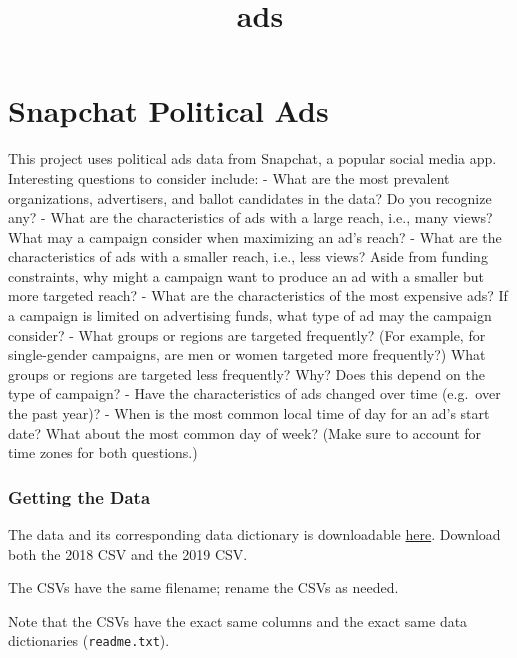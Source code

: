 \documentclass[11pt]{article}
\title{ads}
\begin{document}
    
    
    \maketitle
    
    

    
    \hypertarget{snapchat-political-ads}{%
\section{Snapchat Political Ads}\label{snapchat-political-ads}}

This project uses political ads data from Snapchat, a popular social
media app. Interesting questions to consider include: - What are the
most prevalent organizations, advertisers, and ballot candidates in the
data? Do you recognize any? - What are the characteristics of ads with a
large reach, i.e., many views? What may a campaign consider when
maximizing an ad's reach? - What are the characteristics of ads with a
smaller reach, i.e., less views? Aside from funding constraints, why
might a campaign want to produce an ad with a smaller but more targeted
reach? - What are the characteristics of the most expensive ads? If a
campaign is limited on advertising funds, what type of ad may the
campaign consider? - What groups or regions are targeted frequently?
(For example, for single-gender campaigns, are men or women targeted
more frequently?) What groups or regions are targeted less frequently?
Why? Does this depend on the type of campaign? - Have the
characteristics of ads changed over time (e.g.~over the past year)? -
When is the most common local time of day for an ad's start date? What
about the most common day of week? (Make sure to account for time zones
for both questions.)

\hypertarget{getting-the-data}{%
\subsubsection{Getting the Data}\label{getting-the-data}}

The data and its corresponding data dictionary is downloadable
\href{https://www.snap.com/en-US/political-ads/}{here}. Download both
the 2018 CSV and the 2019 CSV.

The CSVs have the same filename; rename the CSVs as needed.

Note that the CSVs have the exact same columns and the exact same data
dictionaries (\texttt{readme.txt}).
\end{document}
